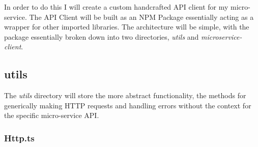 In order to do this I will create a custom handcrafted API client for my micro-service. The API Client will be built as an NPM Package essentially acting as a wrapper for other imported libraries. The architecture will be simple, with the package essentially broken down into two directories, \emph{utils} and \emph{microservice-client}.
\subsection{utils}
The \emph{utils} directory will store the more abstract functionality, the methods for generically making HTTP requests and handling errors without the context for the specific micro-service API.
\subsubsection{Http.ts}
